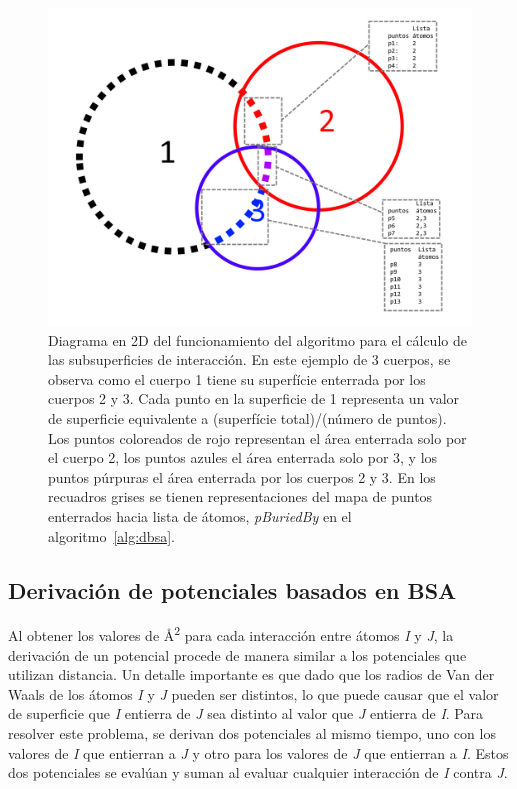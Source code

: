 \begin{figure}[p]
\centering
\includegraphics[width=\textwidth]{figures/dbsa.png}
\caption[Cálculo de subsuperfices de interacción]{Diagrama en 2D del funcionamiento del algoritmo para el cálculo de las subsuperficies de interacción. En este ejemplo de 3 cuerpos, se observa como el cuerpo 1 tiene su superfície enterrada por los cuerpos 2 y 3. Cada punto en la superficie de 1 representa un valor de superficie equivalente a (superfície total)/(número de puntos). Los puntos coloreados de rojo representan el área enterrada solo por el cuerpo 2, los puntos azules el área enterrada solo por 3, y los puntos púrpuras el área enterrada por los cuerpos 2 y 3. En los recuadros grises se tienen representaciones del mapa de puntos enterrados hacia lista de átomos, \textit{pBuriedBy} en el algoritmo~\ref{alg:dbsa}.}
\label{fig:dbsa1}
\end{figure}
\cleardoublepage

\subsection{Derivación de potenciales basados en BSA}
\par
Al obtener los valores de \si{\angstrom}\textsuperscript{2}  para cada interacción entre átomos \textit{I} y \textit{J}, la derivación de un potencial procede de manera similar a los potenciales que utilizan distancia.
Un detalle importante es que dado que los radios de Van der Waals de los átomos \textit{I} y \textit{J} pueden ser distintos, lo que puede causar que el valor de superficie que \textit{I} entierra de \textit{J} sea distinto al valor que \textit{J} entierra de \textit{I}.
Para resolver este problema, se derivan dos potenciales al mismo tiempo, uno con los valores de \textit{I} que entierran a \textit{J} y otro para los valores de \textit{J} que entierran a \textit{I}.
Estos dos potenciales se evalúan y suman al evaluar cualquier interacción de \textit{I} contra \textit{J}.

